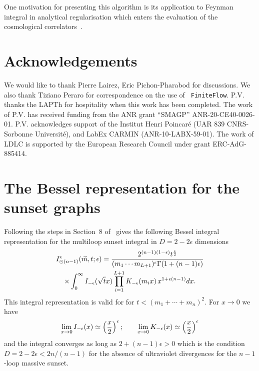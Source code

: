 \documentclass[a4paper,12pt]{article}
\numberwithin{equation}{section}
\numberwithin{figure}{section}
\def\su{\circleddash}
\newcommand{\pvnote}[1]{\sethlcolor{bubblegum} \protect\hl{Pierre V.: #1} \sethlcolor{yellow}}
\begin{document}
One motivation for presenting this algorithm is its application to
Feynman integral in analytical regularisation which enters the evaluation of the cosmological
correlators~\cite{Heckelbacher:2022hbq,Chowdhury:2023khl,Chowdhury:2023arc}. 


\section*{Acknowledgements}
We would like to thank Pierre Lairez,  Eric Pichon-Pharabod  for discussions. We also thank Tiziano Peraro for correspondence on the use of {\tt
	FiniteFlow}. P.V. thanks the LAPTh for hospitality when this
      work has been completed.
The work of P.V. has received funding from the ANR grant ``SMAGP''
ANR-20-CE40-0026-01. P.V. acknowledges support of the Institut Henri
Poincar\'e (UAR 839 CNRS-Sorbonne Universit\'e), and LabEx CARMIN
(ANR-10-LABX-59-01). The work of LDLC is  supported by 
the European Research Council under grant ERC-AdG-885414. 


\appendix\section{The Bessel representation for the sunset graphs}\label{sec:bessel}


Following the steps in Section~8 of~\cite{Vanhove:2014wqa}
gives the following Bessel integral representation for the multiloop
sunset integral in  $D=2-2\epsilon$ dimensions
\begin{multline}
  I_{\su(n-1)}^\epsilon(\vec m,t;\epsilon)=
  {2^{(n-1) (1-\epsilon)} t^{\epsilon\over2} \over    (m_1\cdots m_{L+1})^{\epsilon}
  \Gamma(1+(n-1)\epsilon)}\cr\times\int_0^\infty I_{-\epsilon}(\sqrt{t} x)
  \prod_{i=1}^{L+1}K_{-\epsilon}(m_ix)\,  x^{1+\epsilon(n-1)}dx.
\end{multline}
This integral representation is valid for   for $t<(m_1+\cdots +m_{n})^2$.
%
For $x\to0$ we have
\begin{equation}
  \lim_{x\to0} I_{-\epsilon}(x)\simeq \left(x\over2\right)^{\epsilon};    \qquad
  \lim_{x\to0} K_{-\epsilon}(x)   \simeq \left(x\over2\right)^{\epsilon}
\end{equation}
and the integral converges as long as $2+(n-1)\epsilon>0$ which is the
condition $D=2-2\epsilon< 2n/(n-1)$ for the absence of ultraviolet divergences
for the $n-1$-loop massive sunset.
\end{document}
